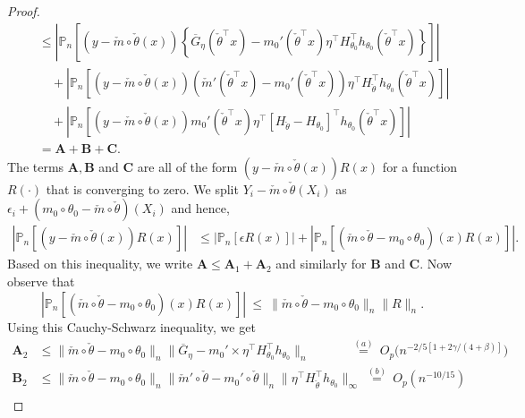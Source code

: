 \begin{proof}
\begin{align*}
&\quad\le \left|\mathbb{P}_n\left[(y - \check{m}\circ\check{\theta}(x))\left\{\overline{G}_{\eta}(\check{\theta}^{\top}x) - m_0'(\check{\theta}^{\top}x)\eta^{\top}H_{\theta_0}^{\top}h_{\theta_0}(\check{\theta}^{\top}x)\right\}\right]\right|\\
&\qquad+ \left|\mathbb{P}_n\left[(y - \check{m}\circ\check{\theta}(x))(\check{m}'(\check{\theta}^{\top}x) - m_0'(\check{\theta}^{\top}x))\eta^{\top}H_{\check{\theta}}^{\top}h_{\theta_0}(\check{\theta}^{\top}x)\right]\right|\\
&\qquad+ \left|\mathbb{P}_n\left[(y - \check{m}\circ\check{\theta}(x))m_0'(\check{\theta}^{\top}x)\eta^{\top}[H_{\check{\theta}} - H_{\theta_0}]^{\top}h_{\theta_0}(\check{\theta}^{\top}x)\right]\right|\\
&\quad= \mathbf{A} + \mathbf{B} + \mathbf{C}.
\end{align*}
The terms $\mathbf{A}, \mathbf{B}$ and $\mathbf{C}$ are all of the form $(y - \check{m}\circ\check{\theta}(x))R(x)$ for a function $R(\cdot)$ that is converging to zero. We split $Y_i - \check{m}\circ\check{\theta}(X_i)$ as $\epsilon_i + (m_0\circ\theta_0 - \check{m}\circ\check{\theta})(X_i)$ and hence,
\begin{align*}
|\mathbb{P}_n[(y - \check{m}\circ\check{\theta}(x))R(x)]| &\le |\mathbb{P}_n[\epsilon R(x)]| + |\mathbb{P}_n[(\check{m}\circ\check{\theta} - m_0\circ\theta_0)(x)R(x)]|.
\end{align*}
Based on this inequality, we write $\mathbf{A} \le \mathbf{A}_1 + \mathbf{A}_2$ and similarly for $\mathbf{B}$ and $\mathbf{C}$. Now observe that
\[
|\mathbb{P}_n[(\check{m}\circ\check{\theta} - m_0\circ\theta_0)(x)R(x)]| ~\le~ \|\check{m}\circ\check{\theta} - m_0\circ\theta_0\|_{n}\|R\|_n.
\]
Using this Cauchy-Schwarz inequality, we get
\begin{align*}
\mathbf{A}_2 &\le \|\check{m}\circ\check{\theta} - m_0\circ\theta_0\|_{n}\|\overline{G}_{\eta} - m_0'\times \eta^{\top}H_{\theta_0}^{\top}h_{\theta_0}\|_n\qquad\quad ~\overset{(a)}{=}~ O_p\big(n^{-2/5 [1 + 2\gamma/(4+\beta)]}\big)\\
\mathbf{B}_2 &\le \|\check{m}\circ\check{\theta} - m_0\circ\theta_0\|_{n}\|\check{m}'\circ\check{\theta} - m_0'\circ\check{\theta}\|_n\|\eta^{\top}H_{\check{\theta}}^{\top}h_{\theta_0}\|_{\infty} ~\overset{(b)}{=}~ O_p(n^{-10/15})\\

\end{align*}
\end{proof}
